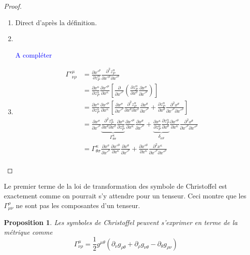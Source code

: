 \documentclass[a4paper,11pt]{report}
\theoremstyle{definition}
\theoremstyle{plain}
\newtheorem{prop}[thm]{Proposition}
\theoremstyle{definition}
\theoremstyle{remark}
\newcommand{\comp}{\begin{center}\textcolor{blue}{A compléter}\end{center}}
\newcommand{\p}{\partial}
\begin{document}
            \begin{proof}${}$\\
            \begin{enumerate}[label = \textit{\roman*)}]
                \item Direct d'après la définition.
                \item ${}$\\
                \comp
                \item \begin{align}
                    \Gamma'^\mu_{\nu\rho} &= \frac{\p x'^\rho}{\p z^\alpha_P}\frac{\p^2 z^\alpha_P}{\p x'^\mu\p x'^\nu} \\
                    &= \frac{\p x^\kappa}{\p z^\alpha_P}\frac{\p x'^\mu}{\p x^\kappa}\left[ \frac{\p}{\p x'^\nu}\left( \frac{\p z^\alpha_P}{\p x^\sigma}\frac{\p x^\sigma}{\p x'^\nu} \right) \right] \\
                    &= \frac{\p x^\kappa}{\p z^\alpha_P}\frac{\p x'^\mu}{\p x^\kappa}\left[\frac{\p x^\sigma}{\p x'^\nu} \frac{\p^2 z^\alpha_P}{\p x^\theta\p x^\sigma}\frac{\p x^\theta}{\p x'^\nu} + \frac{\p z^\alpha_P}{\p x^\theta}\frac{\p^2 x^\theta}{\p x'^\nu\p x'^\rho} \right]\\
                    &= \frac{\p x^\sigma}{\p x'^\nu} \underbrace{\frac{\p^2 z^\alpha_P}{\p x^\theta\p x^\sigma}\frac{\p x^\kappa}{\p z^\alpha_P}}_{\Gamma^\kappa_{\theta\sigma}}\frac{\p x'^\mu}{\p x^\kappa}\frac{\p x^\theta}{\p x'^\nu} +  \underbrace{\frac{\p x^\kappa}{\p z^\alpha_P}\frac{\p z^\alpha_P}{\p x^\theta}}_{\delta_{\kappa\theta}}\frac{\p x'^\mu}{\p x^\kappa}\frac{\p^2 x^\theta}{\p x'^\nu\p x'^\rho}\\
                    &= \Gamma^\kappa_{\theta\sigma}\frac{\p x^\sigma}{\p x'^\nu} \frac{\p x'^\mu}{\p x^\kappa}\frac{\p x^\theta}{\p x'^\nu} +  \frac{\p x'^\mu}{\p x^\kappa}\frac{\p^2 x^\kappa}{\p x'^\nu\p x'^\rho}\\
                \end{align}
            \end{enumerate}
            \end{proof}
            
            Le premier terme de la loi de transformation des symbole de Christoffel est exactement comme on pourrait s'y attendre pour un tenseur. Ceci montre que les $\Gamma^\rho_{\mu\nu}$ ne sont pas les composantes d'un tenseur.
            
            \begin{prop}
                Les symboles de Christoffel peuvent s'exprimer en terme de la métrique comme
                \begin{equation}\label{eq:gammag}
                    \Gamma^\mu_{\nu\rho} = \frac{1}{2}g^{\mu\theta}\left( \p_\nu g_{\rho\theta}+\p_\rho g_{\nu\theta}-\p_\theta g_{\rho\nu} \right)
                \end{equation}
            \end{prop}
            
\end{document}
